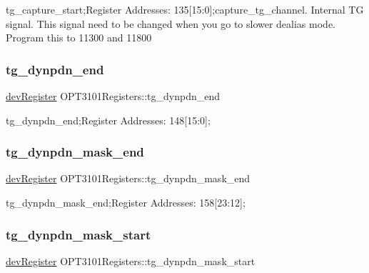 tg\+\_\+capture\+\_\+start;Register Addresses\+: 135\mbox{[}15\+:0\mbox{]};capture\+\_\+tg\+\_\+channel. Internal TG signal. This signal need to be changed when you go to slower dealias mode. Program this to 11300 and 11800 

\mbox{\label{class_o_p_t3101_registers_a5f9e7026b200d2bcc0578376f30b9e16}} 
\subsubsection{\texorpdfstring{tg\+\_\+dynpdn\+\_\+end}{tg\_dynpdn\_end}}
{\footnotesize\ttfamily \mbox{\hyperlink{classdev_register}{dev\+Register}} O\+P\+T3101\+Registers\+::tg\+\_\+dynpdn\+\_\+end}



tg\+\_\+dynpdn\+\_\+end;Register Addresses\+: 148\mbox{[}15\+:0\mbox{]}; 

\mbox{\label{class_o_p_t3101_registers_abb219a99926fa9a5beaaa2419b559274}} 
\subsubsection{\texorpdfstring{tg\+\_\+dynpdn\+\_\+mask\+\_\+end}{tg\_dynpdn\_mask\_end}}
{\footnotesize\ttfamily \mbox{\hyperlink{classdev_register}{dev\+Register}} O\+P\+T3101\+Registers\+::tg\+\_\+dynpdn\+\_\+mask\+\_\+end}



tg\+\_\+dynpdn\+\_\+mask\+\_\+end;Register Addresses\+: 158\mbox{[}23\+:12\mbox{]}; 

\mbox{\label{class_o_p_t3101_registers_a6830ce377ff973553d01d458d7fcae11}} 
\subsubsection{\texorpdfstring{tg\+\_\+dynpdn\+\_\+mask\+\_\+start}{tg\_dynpdn\_mask\_start}}
{\footnotesize\ttfamily \mbox{\hyperlink{classdev_register}{dev\+Register}} O\+P\+T3101\+Registers\+::tg\+\_\+dynpdn\+\_\+mask\+\_\+start}



